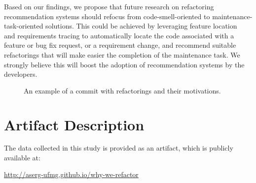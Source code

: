 Based on our findings, we propose that future research on refactoring recommendation systems should refocus from 
code-smell-oriented to maintenance-task-oriented solutions.
This could be achieved by leveraging feature location~\citep{Dit:2013} and requirements tracing to automatically locate the code
associated with a feature or bug fix request, or a requirement change, and recommend suitable refactorings that will make easier the completion
of the maintenance task.
We strongly believe this will boost the adoption of recommendation systems by the developers.




\begin{figure}[b]
	\centering
	\caption{An example of a commit with refactorings and their motivations.}
	\label{navDataset}
\end{figure}



\section{Artifact Description}

The data collected in this study is provided as an artifact, which is publicly available at:\margin

\noindent \url{http://aserg-ufmg.github.io/why-we-refactor}\margin

